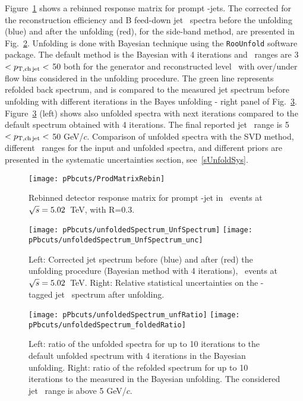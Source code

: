 Figure~\ref{fig:pPb_ResponseMatrix_Dzero} shows a rebinned response matrix for prompt \Dzero-jets.
The corrected for the reconstruction efficiency and B feed-down jet \pt\ spectra before the unfolding (blue) and after the unfolding (red), for the side-band method, are presented in Fig.~\ref{fig:UnfSpec_pPb_Dzero}.
Unfolding is done with Bayesian technique using the \texttt{RooUnfold} software package. The default method is the Bayesian with 4 iterations and \ptchjet\ ranges are 3 $< p_{\mathrm{T,ch\, jet}}< $ 50 both for the generator and reconstructed level \pt\, with over/under flow bins considered in the unfolding procedure.
The green line represents refolded back spectrum, and is compared to the measured jet spectrum before unfolding with different iterations in the Bayes unfolding - right panel of Fig.~\ref{fig:unfIterations_pPb_Dzero}. Figure~\ref{fig:unfIterations_pPb_Dzero} (left) shows also unfolded spectra with next iterations compared to the default spectrum obtained with 4 iterations.
The final reported jet \pt\ range is 5 $< p_{\mathrm{T,ch\, jet}}<$ 50 GeV/$c$.
Comparison of unfolded spectra with the SVD method, different \pt\ ranges for the input and unfolded spectra, and different priors are presented in the systematic uncertainties section, see~\ref{sUnfoldSys}. 

\begin{figure}[bth]
\centering
\texttt{[image: pPbcuts/ProdMatrixRebin]}
\caption{Rebinned detector response matrix for prompt \Dzero-jet in \pp\ events at $\sqrt{s}=5.02$~TeV, with R=0.3.}
\label{fig:pPb_ResponseMatrix_Dzero}
\end{figure}

\begin{figure}[bth]
\centering
\texttt{[image: pPbcuts/unfoldedSpectrum\_UnfSpectrum]}
\texttt{[image: pPbcuts/unfoldedSpectrum\_UnfSpectrum\_unc]}
\caption{Left: Corrected jet \pt spectrum before (blue) and after (red) the unfolding procedure (Bayesian method with 4 iterations), \pp\ events at $\sqrt{s}=5.02$~TeV. Right: Relative statistical uncertainties on the \Dzero-tagged jet \pt\ spectrum after unfolding.}
\label{fig:UnfSpec_pPb_Dzero}
\end{figure}

\begin{figure}[bth]
\centering
\texttt{[image: pPbcuts/unfoldedSpectrum\_unfRatio]}
\texttt{[image: pPbcuts/unfoldedSpectrum\_foldedRatio]}
\caption{Left: ratio of the unfolded spectra for up to 10 iterations to the default unfolded spectrum with 4 iterations in the Bayesian unfolding. Right: ratio of the refolded spectrum for up to 10 iterations to the measured in the Bayesian unfolding. The considered jet \pt\ range is above 5 GeV/$c$.}
\label{fig:unfIterations_pPb_Dzero}
\end{figure}

